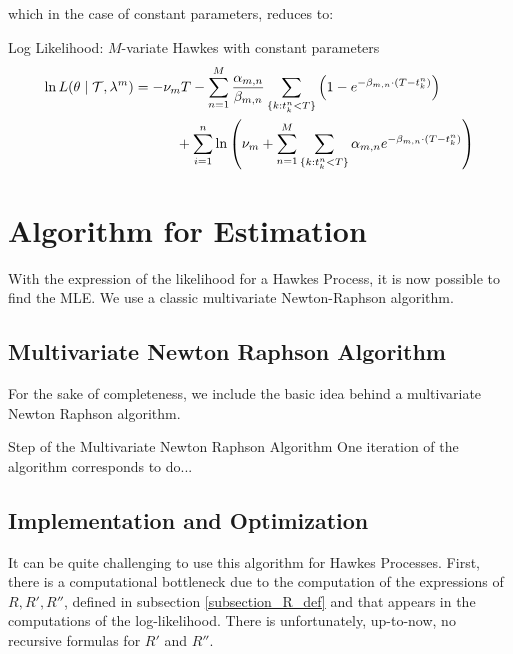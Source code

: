 \documentclass[11pt]{book}
\begin{document}
which in the case of constant parameters, reduces to:

\begin{theoreme}[label = thrm:ln-like]{Log Likelihood: $M$-variate Hawkes with constant parameters}
\begin{align}
\ln L( \theta \mid \mathcal{T}, \lambda^{m} ) &= - \nu_m T  - \sum_{n = 1}^M \frac{\alpha_{m,n}}{ \beta_{m,n} } \sum_{ \{k: t_k^n < T \}} \left ( 1 - e^{- \beta_{m,n} \cdot ( T - t_k^n ) }  \right )  \notag
\\ & \quad \qquad + \sum_{i=1}^n  \ln \left ( 
\nu_m + \sum_{n = 1}^M \sum_{ \{k: t_k^n < T \}} \alpha_{m,n} e^{- \beta_{m,n} \cdot ( T - t_k^n ) }
\right ) 
\end{align}
\end{theoreme}







\section{Algorithm for Estimation}
With the expression of the likelihood for a Hawkes Process, it is now possible to find the MLE. We use a classic multivariate Newton-Raphson algorithm. 

\subsection{Multivariate Newton Raphson Algorithm}
For the sake of completeness, we include the basic idea behind a multivariate Newton Raphson algorithm. 



\begin{theoreme}{Step of the Multivariate Newton Raphson Algorithm}
One iteration of the algorithm corresponds to do...
\end{theoreme}

\subsection{Implementation and Optimization}
\label{subsection:challenge}
It can be quite challenging to use this algorithm for Hawkes Processes. First, there is a computational bottleneck due to the computation of the expressions of $R, R', R''$, defined in subsection \ref{subsection_R_def} and that appears in the computations of the log-likelihood. There is unfortunately, up-to-now, no recursive formulas for $R'$ and $R''$. 
\end{document}
